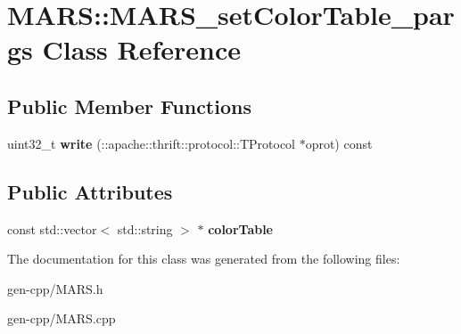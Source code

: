 \hypertarget{classMARS_1_1MARS__setColorTable__pargs}{}\section{M\+A\+RS\+:\+:M\+A\+R\+S\+\_\+set\+Color\+Table\+\_\+pargs Class Reference}
\label{classMARS_1_1MARS__setColorTable__pargs}
\subsection*{Public Member Functions}
\begin{DoxyCompactItemize}
\item 
\mbox{\label{classMARS_1_1MARS__setColorTable__pargs_a3e0cd757266eaf501c23620821e6853d}} 
uint32\+\_\+t {\bfseries write} (\+::apache\+::thrift\+::protocol\+::\+T\+Protocol $\ast$oprot) const
\end{DoxyCompactItemize}
\subsection*{Public Attributes}
\begin{DoxyCompactItemize}
\item 
\mbox{\label{classMARS_1_1MARS__setColorTable__pargs_a29a2023a8cdbbb4d78cfb6fb4ef5377f}} 
const std\+::vector$<$ std\+::string $>$ $\ast$ {\bfseries color\+Table}
\end{DoxyCompactItemize}


The documentation for this class was generated from the following files\+:\begin{DoxyCompactItemize}
\item 
gen-\/cpp/M\+A\+R\+S.\+h\item 
gen-\/cpp/M\+A\+R\+S.\+cpp\end{DoxyCompactItemize}
